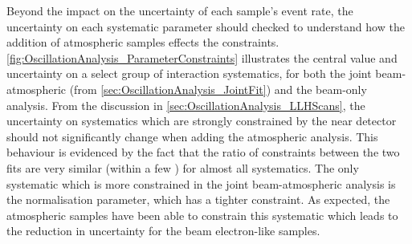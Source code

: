 Beyond the impact on the uncertainty of each sample's event rate, the uncertainty on each systematic parameter should checked to understand how the addition of atmospheric samples effects the constraints. \autoref{fig:OscillationAnalysis_ParameterConstraints} illustrates the central value and uncertainty on a select group of interaction systematics, for both the joint beam-atmospheric (from \autoref{sec:OscillationAnalysis_JointFit}) and the beam-only analysis. From the discussion in \autoref{sec:OscillationAnalysis_LLHScans}, the uncertainty on systematics which are strongly constrained by the near detector should not significantly change when adding the atmospheric analysis. This behaviour is evidenced by the fact that the ratio of constraints between the two fits are very similar (within a few \quickmath{\%}) for almost all systematics. The only systematic which is more constrained in the joint beam-atmospheric analysis is the  normalisation parameter, which has a  tighter constraint. As expected, the atmospheric samples have been able to constrain this systematic which leads to the reduction in uncertainty for the beam electron-like samples.

